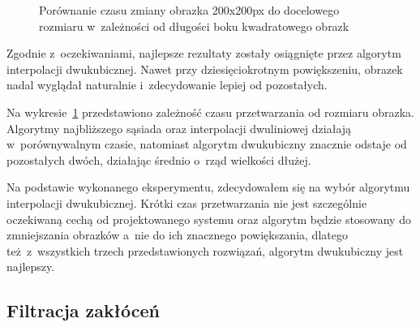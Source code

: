 \begin{figure}[h]
    \centering
    \caption{Porównanie czasu zmiany obrazka 200x200px do docelowego rozmiaru w~zależności od długości boku kwadratowego obrazk}
    \label{fig:resizing-time}
\end{figure}

Zgodnie z~oczekiwaniami, najlepsze rezultaty zostały osiągnięte przez algorytm interpolacji dwukubicznej. Nawet przy dziesięciokrotnym powiększeniu, obrazek nadal wyglądał naturalnie i~zdecydowanie lepiej od pozostałych.  

Na wykresie~\ref{fig:resizing-time} przedstawiono zależność czasu przetwarzania od rozmiaru obrazka. Algorytmy najbliższego sąsiada oraz interpolacji dwuliniowej działają w~porównywalnym czasie, natomiast algorytm dwukubiczny znacznie odstaje od pozostałych dwóch, działając średnio o~rząd wielkości dłużej.

Na podstawie wykonanego eksperymentu, zdecydowałem się na wybór algorytmu interpolacji dwukubicznej. Krótki czas przetwarzania nie jest szczególnie oczekiwaną cechą od projektowanego systemu oraz algorytm będzie stosowany do zmniejszania obrazków a~nie do ich znacznego powiększania, dlatego też z~wszystkich trzech przedstawionych rozwiązań, algorytm dwukubiczny jest najlepszy.

\subsection{Filtracja zakłóceń}
